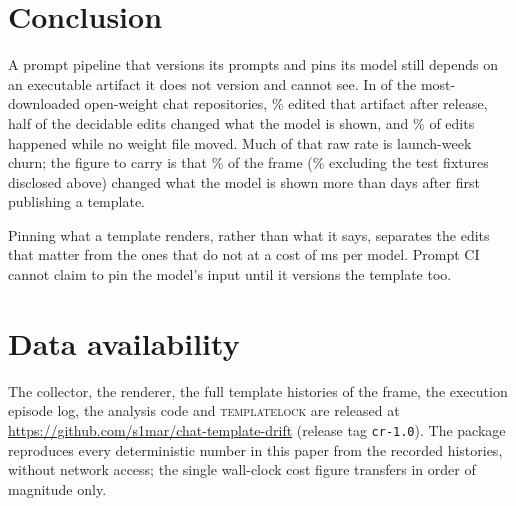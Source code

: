 \section{Conclusion}

A prompt pipeline that versions its prompts and pins its model still depends on an executable
artifact it does not version and cannot see. In \NFrame{} of the most-downloaded open-weight chat
repositories, \PctDrifted\% edited that artifact after release, half of the decidable edits changed
what the model is shown, and \PctEventsWeightSilent\% of edits happened while no weight file moved.
Much of that raw rate is launch-week churn; the figure to carry is that \PctBehSettledFrame\% of the
frame (\PctBehSettledNoFix\% excluding the test fixtures disclosed above) changed what the model is
shown more than \SettledDays{} days after first publishing a
template.

Pinning what a template renders, rather than what it says, separates the edits that matter from the
ones that do not at a cost of \CostComputeMs{} ms per model. Prompt CI cannot claim to pin the model's input
until it versions the template too.

\section*{Data availability}

The collector, the renderer, the full template histories of the frame, the execution episode log,
the analysis code and \textsc{templatelock} are released at
\url{https://github.com/s1mar/chat-template-drift} (release tag \texttt{cr-1.0}). The package
reproduces every deterministic number in this paper from the recorded histories, without network
access; the single wall-clock cost figure transfers in order of magnitude only.
